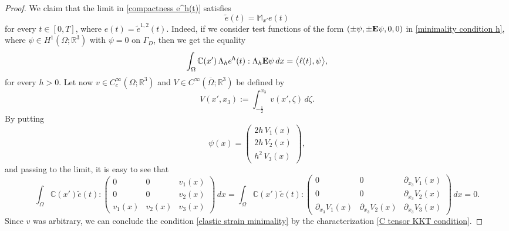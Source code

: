 \documentclass[reqno,10pt]{amsart}
\numberwithin{equation}{section}
\theoremstyle{remark}
\newcommand{\RED}{\color{black}}
\newcommand{\BLACK}{\color{black}}
\newcommand{\C}{\mathbb{C}}
\newcommand{\M}{\mathbb{M}}
\newcommand{\R}{\mathbb{R}}
\newcommand{\closure}[1]{\overline{#1}}
\newcommand{\Dir}{D}
\newcommand{\E}{{\bf E}}
\begin{document}
\begin{proof}
\medskip
{} \nopagebreak

We claim that the limit in \eqref{compactness e^h(t)} satisfies
\begin{equation} \label{elastic strain minimality}
	\tilde{e}(t) = \M_{x'} e(t)
\end{equation}
for every $t \in [0, T]${\RED, where $e(t) = \tilde{e}^{1,2}(t)$\BLACK}. 
Indeed, if we consider test functions of the form $(\pm\psi, \pm{\E}\psi, 0, 0)$ in \eqref{minimality condition h}, where $\psi \in H^1(\Omega;\R^3)$ with $\psi = 0$ on $\Gamma_\Dir$, then we get the equality 
\[
	\int_{\Omega} \C\!\left(x'\right) \Lambda_h e^h(t) : \Lambda_h {\E}\psi \,dx = \big\langle \ell(t), \psi \big\rangle,
\]
for every $h > 0$. 
Let now $v \in C_c^{\infty}(\Omega;\R^3)$ and $V \in C^{\infty}(\closure{\Omega};\R^3)$ be defined by
\begin{equation*}
	V(x',x_3) := \int_{-\frac{1}{2}}^{x_3} v(x',\zeta) \,d\zeta.
\end{equation*}
By putting
\begin{equation*}
	\psi(x) = \left(\begin{array}{c} 2h\,V_1(x) \\ 2h\,V_2(x) \\ h^2\,V_3(x) \end{array}\right),
\end{equation*}
and passing to the limit, it is easy to see that
\begin{equation*}
	\int_{\Omega} \C\!\left(x'\right) \tilde{e}(t) : \left(\begin{array}{ccc} 0 & 0 & v_1(x) \\ 0 & 0 & v_2(x) \\ v_1(x) & v_2(x) & v_3(x) \end{array} \right) \,dx = \int_{\Omega} \C\!\left(x'\right) \tilde{e}(t) : \left(\begin{array}{ccc} 0 & 0 & \partial_{x_3}V_1(x) \\ 0 & 0 & \partial_{x_3}V_2(x) \\ \partial_{x_3}V_1(x) & \partial_{x_3}V_2(x) & \partial_{x_3}V_3(x) \end{array} \right) \,dx = 0.
\end{equation*}
Since $v$ was arbitrary, we can conclude the condition \eqref{elastic strain minimality} by the characterization \eqref{C tensor KKT condition}.

\medskip
{} \nopagebreak


\end{proof}
\end{document}
